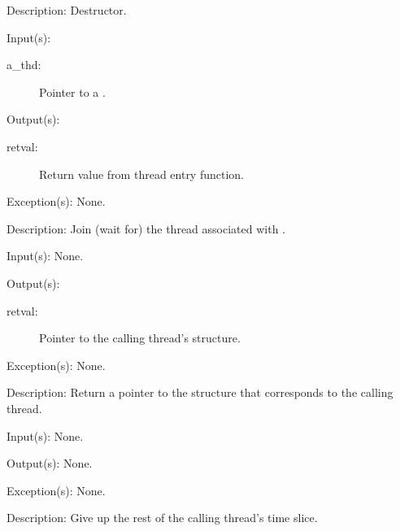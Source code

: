 \begin{capi}
\begin{capilist}
	\item[Description: ]
		Destructor.
	\end{capilist}
\label{thd_join}
	\begin{capilist}
	\item[Input(s): ]
		\begin{description}\item[]
		\item[a\_thd: ] Pointer to a .
		\end{description}
	\item[Output(s): ]
		\begin{description}\item[]
		\item[retval: ]
			Return value from thread entry function.
		\end{description}
	\item[Exception(s): ] None.
	\item[Description: ]
		Join (wait for) the thread associated with .
	\end{capilist}
\label{thd_self}
	\begin{capilist}
	\item[Input(s): ] None.
	\item[Output(s): ]
		\begin{description}\item[]
		\item[retval: ]
			Pointer to the calling thread's \classname{thd}
			structure.
		\end{description}
	\item[Exception(s): ] None.
	\item[Description: ]
		Return a pointer to the  structure that
		corresponds to the calling thread.
	\end{capilist}
\label{thd_yield}
	\begin{capilist}
	\item[Input(s): ] None.
	\item[Output(s): ] None.
	\item[Exception(s): ] None.
	\item[Description: ]
		Give up the rest of the calling thread's time slice.
	\end{capilist}
\label{thd_sigmask}
\end{capi}
